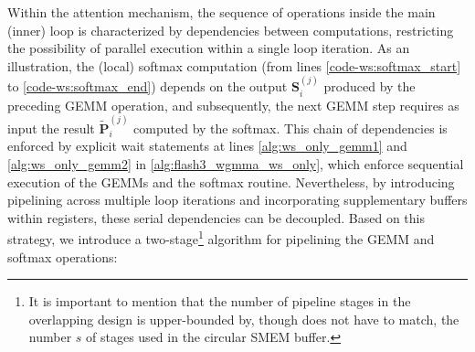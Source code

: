 Within the attention mechanism, the sequence of operations inside the main (inner) loop is characterized by dependencies between computations, restricting the possibility of parallel execution within a single loop iteration. As an illustration, the (local) softmax computation (from lines \ref{code-ws:softmax_start} to \ref{code-ws:softmax_end}) depends on the output $\mathbf{S}_i^{(j)}$ produced by the preceding GEMM operation, and subsequently, the next GEMM step requires as input the result $\widetilde{\mathbf{P}}_i^{(j)}$ computed by the softmax. This chain of dependencies is enforced by explicit wait statements at lines \ref{alg:ws_only_gemm1} and \ref{alg:ws_only_gemm2} in \cref{alg:flash3_wgmma_ws_only}, which enforce sequential execution of the GEMMs and the softmax routine. Nevertheless, by introducing pipelining across multiple loop iterations and incorporating supplementary buffers within registers, these serial dependencies can be decoupled. Based on this strategy, we introduce a two-stage\footnote{It is important to mention that the number of pipeline stages in the overlapping design is upper-bounded by, though does not have to match, the number $s$ of stages used in the circular SMEM buffer.} algorithm for pipelining the GEMM and softmax operations:

